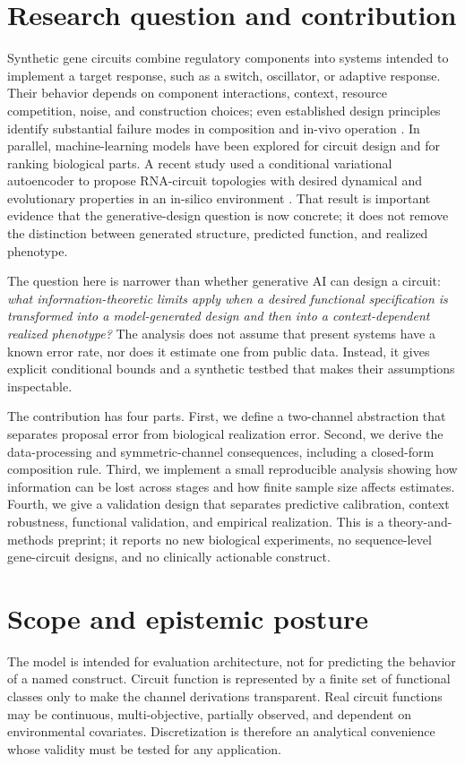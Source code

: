 \documentclass[11pt]{article}
\begin{document}
\section{Research question and contribution}
Synthetic gene circuits combine regulatory components into systems intended to implement a target response, such as a switch, oscillator, or adaptive response. Their behavior depends on component interactions, context, resource competition, noise, and construction choices; even established design principles identify substantial failure modes in composition and in-vivo operation \parencite{Elowitz2000,Gardner2000,BrophyVoigt2014}. In parallel, machine-learning models have been explored for circuit design and for ranking biological parts. A recent study used a conditional variational autoencoder to propose RNA-circuit topologies with desired dynamical and evolutionary properties in an in-silico environment \parencite{GallupSteel2026}. That result is important evidence that the generative-design question is now concrete; it does not remove the distinction between generated structure, predicted function, and realized phenotype.

The question here is narrower than whether generative AI can design a circuit: \emph{what information-theoretic limits apply when a desired functional specification is transformed into a model-generated design and then into a context-dependent realized phenotype?} The analysis does not assume that present systems have a known error rate, nor does it estimate one from public data. Instead, it gives explicit conditional bounds and a synthetic testbed that makes their assumptions inspectable.

The contribution has four parts. First, we define a two-channel abstraction that separates proposal error from biological realization error. Second, we derive the data-processing and symmetric-channel consequences, including a closed-form composition rule. Third, we implement a small reproducible analysis showing how information can be lost across stages and how finite sample size affects estimates. Fourth, we give a validation design that separates predictive calibration, context robustness, functional validation, and empirical realization. This is a theory-and-methods preprint; it reports no new biological experiments, no sequence-level gene-circuit designs, and no clinically actionable construct.

\section{Scope and epistemic posture}
The model is intended for evaluation architecture, not for predicting the behavior of a named construct. Circuit function is represented by a finite set of functional classes only to make the channel derivations transparent. Real circuit functions may be continuous, multi-objective, partially observed, and dependent on environmental covariates. Discretization is therefore an analytical convenience whose validity must be tested for any application.
\end{document}
